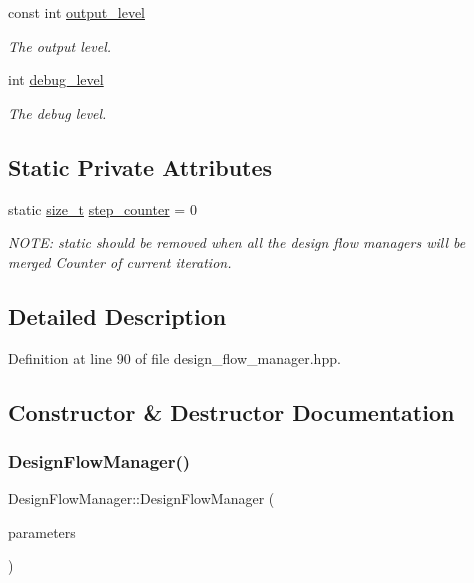 \begin{DoxyCompactItemize}
const int \hyperlink{classDesignFlowManager_ad7b7d5778dda58ed7bd03a1f4a609279}{output\+\_\+level}
\begin{DoxyCompactList}\small\item\em The output level. \end{DoxyCompactList}\item 
int \hyperlink{classDesignFlowManager_a339b488636513296591ea1491e19744d}{debug\+\_\+level}
\begin{DoxyCompactList}\small\item\em The debug level. \end{DoxyCompactList}\end{DoxyCompactItemize}
\subsection*{Static Private Attributes}
\begin{DoxyCompactItemize}
\item 
static \hyperlink{tutorial__fpt__2017_2intro_2sixth_2test_8c_a7c94ea6f8948649f8d181ae55911eeaf}{size\+\_\+t} \hyperlink{classDesignFlowManager_a7f27cfe1cb613464bd12f024a14a1ac0}{step\+\_\+counter} = 0
\begin{DoxyCompactList}\small\item\em N\+O\+TE\+: static should be removed when all the design flow managers will be merged Counter of current iteration. \end{DoxyCompactList}\end{DoxyCompactItemize}


\subsection{Detailed Description}


Definition at line 90 of file design\+\_\+flow\+\_\+manager.\+hpp.



\subsection{Constructor \& Destructor Documentation}
\mbox{\label{classDesignFlowManager_a50d4704e76a3132f1cfc24884055faa7}} 
\subsubsection{\texorpdfstring{Design\+Flow\+Manager()}{DesignFlowManager()}}
{\footnotesize\ttfamily Design\+Flow\+Manager\+::\+Design\+Flow\+Manager (\begin{DoxyParamCaption}\item[{const \hyperlink{Parameter_8hpp_a37841774a6fcb479b597fdf8955eb4ea}{Parameter\+Const\+Ref}}]{parameters }\end{DoxyParamCaption})\hspace{0.3cm}{\ttfamily [explicit]}}



